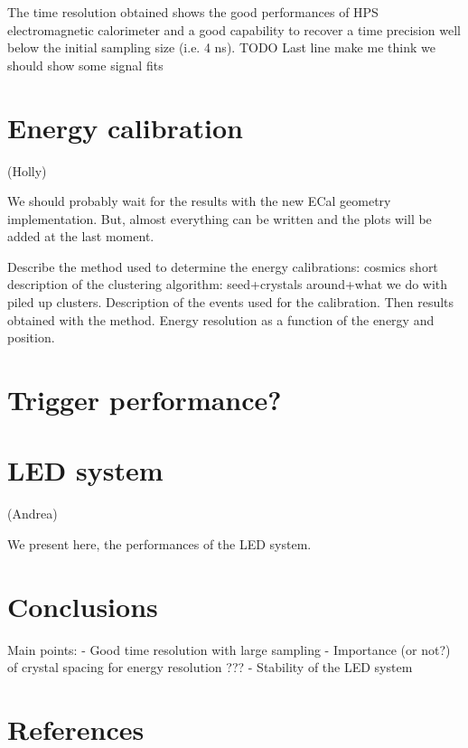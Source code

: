 \documentclass[review]{elsarticle}
\begin{document}
The time resolution obtained shows the good performances of HPS electromagnetic 
calorimeter and a good capability to recover a time
precision well below the initial sampling size (i.e. 4 ns).
TODO Last line make me think we should show some signal fits

\section{Energy calibration}
(Holly)

We should probably wait for the results with the new ECal geometry 
implementation. But, almost everything can be written and the plots will be 
added at the last moment.

Describe the method used to determine the energy calibrations: 
cosmics 
short description of the clustering algorithm: seed+crystals around+what we do with piled up clusters.
Description of the events used for the calibration.
Then results obtained with the method. Energy resolution as a function of the energy and position. 

\section{Trigger performance?}

\section{LED system}
(Andrea)

We present here, the performances of the LED system. 

\section{Conclusions}

Main points:
 - Good time resolution with large sampling
 - Importance (or not?) of crystal spacing for energy resolution ???
 - Stability of the LED system

\section*{References}




\end{document}
